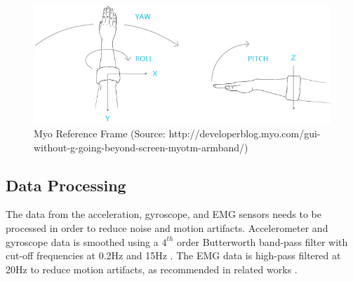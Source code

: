 \begin{figure}
	\centering
	\includegraphics[width=0.7\linewidth]{pictures/myo}
	\caption{Myo Reference Frame (Source: http://developerblog.myo.com/gui-without-g-going-beyond-screen-myotm-armband/)}
	\label{fig:myo}
\end{figure}


\subsection{Data Processing}
\label{sec:Approach:Data-Processing}
The data from the acceleration, gyroscope, and EMG sensors needs to be processed in order to reduce noise and motion artifacts. Accelerometer and gyroscope data is smoothed using a $4^{th}$ order Butterworth band-pass filter with cut-off frequencies at 0.2Hz and 15Hz \cite{1419604}. The EMG data is high-pass filtered at 20Hz to reduce motion artifacts, as recommended in related works \cite{DeLuca2010}.

